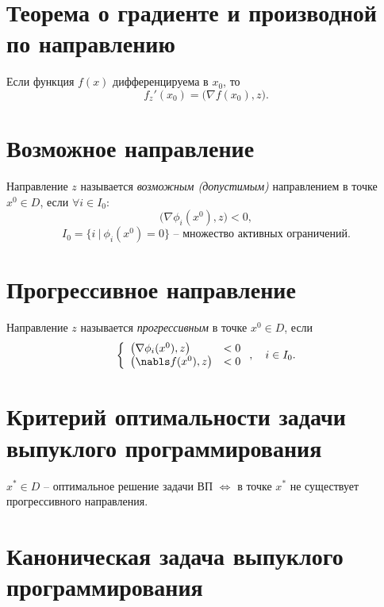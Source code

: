 \section{Теорема о градиенте и производной по направлению}

\begin{theorem}
	Если функция $f(x)$ дифференцируема в $x_0$, то
	\[
		f_{z}'(x_0) = \big(\nabla f(x_0),z\big).
	\]
\end{theorem}

\section{Возможное направление}

\begin{definition}
	Направление $z$ называется \emph{возможным (допустимым)} направлением в точке $x^0 \in D$, если $\forall i \in I_0:$
	\[
		\big(\nabla \phi_i(x^0),z\big) < 0,
	\]
	\[
		I_0 = \big\{i \ | \ \phi_i(x^0) = 0\big\} \text{ -- множество активных ограничений}.
	\]
\end{definition}

\section{Прогрессивное направление}

\begin{definition}
	Направление $z$ называется \emph{прогрессивным} в точке $x^0 \in D$, если
	\[
		\left\{\begin{array}{ll}
			\big(\nabla \phi_i(x^0),z\big) & < 0 \\
			\big(\nabls f(x^0),z\big)      & < 0
		\end{array}\right., \quad i \in I_0.
	\]
\end{definition}

\section{Критерий оптимальности задачи выпуклого программирования}

\begin{theorem}
	$x^* \in D$ -- оптимальное решение задачи ВП $\iff $ в точке $x^*$ не существует прогрессивного направления.
\end{theorem}

\newpage

\section{Каноническая задача выпуклого программирования}

